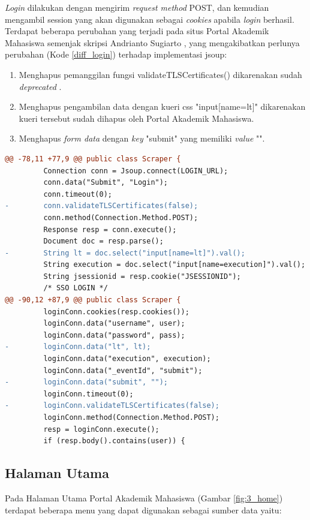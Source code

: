 \textit{Login} dilakukan dengan mengirim \textit{request method} POST, dan kemudian mengambil session yang akan digunakan sebagai \textit{cookies} apabila \textit{login} berhasil.
Terdapat beberapa perubahan yang terjadi pada situs Portal Akademik Mahasiswa semenjak skripsi Andrianto Sugiarto \cite{ifstupor}, yang mengakibatkan perlunya perubahan (Kode \ref{diff_login}) terhadap implementasi jsoup:

\begin{enumerate}
    \item Menghapus pemanggilan fungsi validateTLSCertificates() dikarenakan sudah \textit{deprecated} \cite{jsoup}.
    \item Menghapus pengambilan data dengan kueri css "input[name=lt]" dikarenakan kueri tersebut sudah dihapus oleh Portal Akademik Mahasiswa.
    \item Menghapus \textit{form data} dengan \textit{key} "submit" yang memiliki \textit{value} "".
\end{enumerate}

\begin{lstlisting}[language=diff, caption=Perubahan Implementasi Jsoup Login, label=diff_login]
@@ -78,11 +77,9 @@ public class Scraper {
         Connection conn = Jsoup.connect(LOGIN_URL);
         conn.data("Submit", "Login");
         conn.timeout(0);
-        conn.validateTLSCertificates(false);
         conn.method(Connection.Method.POST);
         Response resp = conn.execute();
         Document doc = resp.parse();
-        String lt = doc.select("input[name=lt]").val();
         String execution = doc.select("input[name=execution]").val();
         String jsessionid = resp.cookie("JSESSIONID");
         /* SSO LOGIN */
@@ -90,12 +87,9 @@ public class Scraper {
         loginConn.cookies(resp.cookies());
         loginConn.data("username", user);
         loginConn.data("password", pass);
-        loginConn.data("lt", lt);
         loginConn.data("execution", execution);
         loginConn.data("_eventId", "submit");
-        loginConn.data("submit", "");
         loginConn.timeout(0);
-        loginConn.validateTLSCertificates(false);
         loginConn.method(Connection.Method.POST);
         resp = loginConn.execute();
         if (resp.body().contains(user)) {
\end{lstlisting}

\subsection{Halaman Utama}
Pada Halaman Utama Portal Akademik Mahasiswa (Gambar \ref{fig:3_home}) terdapat beberapa menu yang dapat digunakan sebagai sumber data yaitu: 

